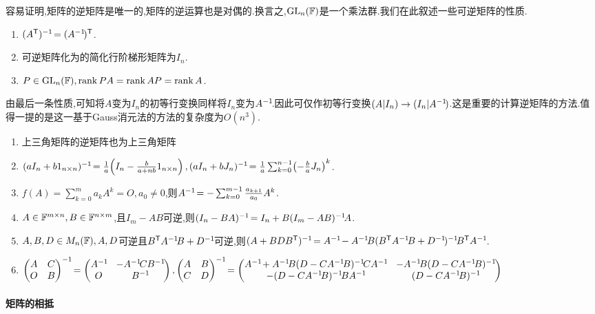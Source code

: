 \documentclass[openany]{book}
\begin{document}
容易证明,矩阵的逆矩阵是唯一的,矩阵的逆运算也是对偶的.换言之,$\operatorname{GL}_n(\mathbb{F})$是一个乘法群.我们在此叙述一些可逆矩阵的性质.
\begin{enumerate}
    \item $(A^{\mathsf{T}})^{-1}\!=(A^{-1}\!)^{\mathsf{T}}$.
    \item 可逆矩阵化为的简化行阶梯形矩阵为$I_n$.
    \item $P\in \operatorname{GL}_n(\mathbb{F}), \operatorname{rank} PA=\operatorname{rank} AP=\operatorname{rank} A$.
\end{enumerate}
由最后一条性质,可知将$A$变为$I_n$的初等行变换同样将$I_n$变为$A^{-1}\!$.因此可仅作初等行变换$(A|I_n)\to(I_n|A^{-1}\!)$.这是重要的计算逆矩阵的方法.值得一提的是这一基于Gauss消元法的方法的复杂度为$O(n^3)$.

\begin{enumerate}[resume]
    \item 上三角矩阵的逆矩阵也为上三角矩阵
    \item $(aI_n+b1_{n\times n})^{-1}\!=\frac{1}{a}\!\left(I_n-\frac{b}{a+nb}1_{n\times n}\right),(aI_n+bJ_n)^{-1}\!=\frac{1}{a}\sum_{k=0}^{n-1}\!\left(-\frac{b}{a}J_n\right)^k$.
    \item $f(A)=\sum_{k=0}^m a_kA^k=O,a_0\neq 0$,则$A^{-1}\!=-\sum_{k=0}^{m-1}\frac{a_{k+1}}{a_0}A^k$.
    \item $A\in\mathbb{F}^{m\times n},B\in \mathbb{F}^{n\times m}$,且$I_m-AB$可逆,则$(I_n-BA)^{-1}\!=I_n+B(I_m-AB)^{-1}\! A$.
    \item $A,B,D\in M_n(\mathbb{F}),A,D$可逆且$B^{\mathsf{T}} A^{-1}\! B+D^{-1}\!$可逆,则$(A+BDB^{\mathsf{T}})^{-1}\!=A^{-1}\!-A^{-1}\! B(B^{\mathsf{T}} A^{-1}\! B+D^{-1}\!)^{-1}\! B^{\mathsf{T}} A^{-1}\!$.
    \item $\begin{pmatrix}
        A&C\\O&B
    \end{pmatrix}\rev=\begin{pmatrix}
        A\rev&-A\rev CB\rev\\O&B\rev
    \end{pmatrix},\begin{pmatrix}
        A&B\\C&D
    \end{pmatrix}\rev=\begin{pmatrix}
        A\rev+A\rev B(D-CA\rev B)\rev CA\rev&-A\rev B(D-CA\rev B)\rev\\
        -(D-CA\rev B)\rev BA\rev&(D-CA\rev B)\rev
    \end{pmatrix}$
\end{enumerate}

\paragraph{矩阵的相抵}
\end{document}
